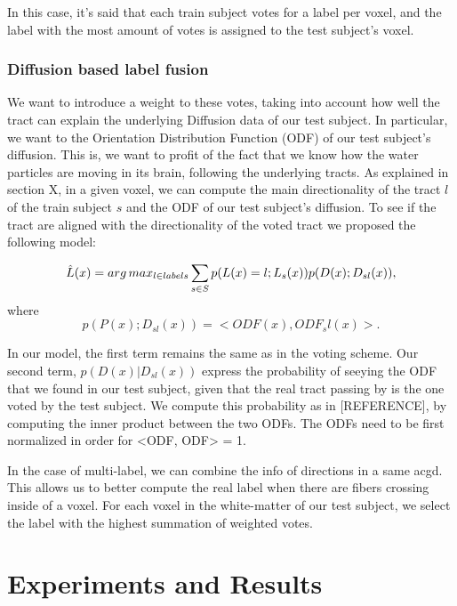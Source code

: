 In this case, it's said that each train subject votes for a label per voxel,
and the label with the most amount of votes is assigned to the test subject's
voxel.

\subsubsection{Diffusion based label fusion}
We want to introduce a weight to these votes, taking into account how well the
tract can explain the underlying Diffusion data of our test subject. In
particular, we want to the Orientation Distribution Function (ODF) of our
test subject's diffusion. This is, we want to profit of the fact that we know
how the water particles are moving in its brain, following the underlying tracts.
As explained in section X, in a given voxel, we can compute the main
directionality of the tract $l$ of the train subject $s$ and the ODF of our
test subject's diffusion. To see if the tract are aligned with the
directionality of the voted tract we proposed the following model:

\begin{equation}
\label{eq:argmax}
\hat L(x) = arg\,max_{l \in labels} \sum_{s\in S} p(L(x) = l ; L_s(x)) p(D(x) ; D_{sl}(x)),
\end{equation}
where
\begin{equation}
\label{eq:peaks}
p(P(x) ; D_{sl}(x)) = <ODF(x), ODF_sl(x)>.
\end{equation}

In our model, the first term remains the same as in the voting scheme.
Our second term, $p(D(x) | D_{sl}(x))$ express the probability
of seeying the ODF that we found in our test subject, given that the real
tract passing by is the one voted by the test subject. We compute this
probability as in [REFERENCE], by computing the inner product between the
two ODFs. The ODFs need to be first normalized in order for <ODF, ODF> = 1.

In the case of multi-label, we can combine the info of directions in a same acgd.
This allows us to better compute the real label when there are fibers crossing
inside of a voxel.
For each voxel in the white-matter of our test subject, we select the label
with the highest summation of weighted votes. 

\section{Experiments and Results}

